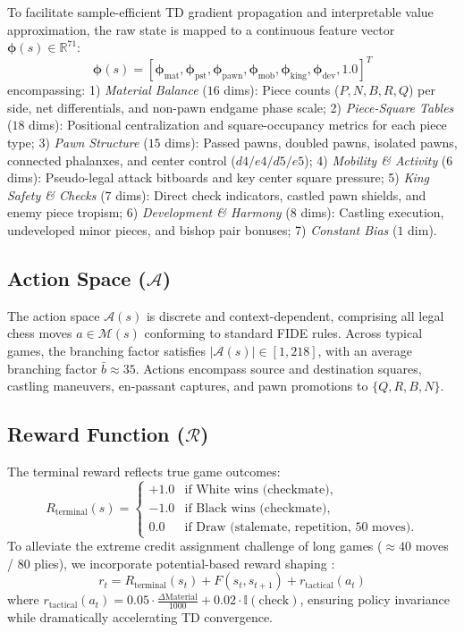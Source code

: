 \documentclass[conference,10pt,twocolumn]{IEEEtran}
\begin{document}
To facilitate sample-efficient TD gradient propagation and interpretable value approximation, the raw state is mapped to a continuous feature vector $\boldsymbol{\phi}(s) \in \mathbb{R}^{71}$:
\begin{equation}
\boldsymbol{\phi}(s) = \left[ \boldsymbol{\phi}_{\text{mat}}, \boldsymbol{\phi}_{\text{pst}}, \boldsymbol{\phi}_{\text{pawn}}, \boldsymbol{\phi}_{\text{mob}}, \boldsymbol{\phi}_{\text{king}}, \boldsymbol{\phi}_{\text{dev}}, 1.0 \right]^T
\end{equation}
encompassing:
1) \textit{Material Balance} ($16$ dims): Piece counts ($P, N, B, R, Q$) per side, net differentials, and non-pawn endgame phase scale;
2) \textit{Piece-Square Tables} ($18$ dims): Positional centralization and square-occupancy metrics for each piece type;
3) \textit{Pawn Structure} ($15$ dims): Passed pawns, doubled pawns, isolated pawns, connected phalanxes, and center control ($d4/e4/d5/e5$);
4) \textit{Mobility \& Activity} ($6$ dims): Pseudo-legal attack bitboards and key center square pressure;
5) \textit{King Safety \& Checks} ($7$ dims): Direct check indicators, castled pawn shields, and enemy piece tropism;
6) \textit{Development \& Harmony} ($8$ dims): Castling execution, undeveloped minor pieces, and bishop pair bonuses;
7) \textit{Constant Bias} ($1$ dim).

\subsection{Action Space ($\mathcal{A}$)}
The action space $\mathcal{A}(s)$ is discrete and context-dependent, comprising all legal chess moves $a \in \mathcal{M}(s)$ conforming to standard FIDE rules. Across typical games, the branching factor satisfies $|\mathcal{A}(s)| \in [1, 218]$, with an average branching factor $\bar{b} \approx 35$. Actions encompass source and destination squares, castling maneuvers, en-passant captures, and pawn promotions to $\{Q, R, B, N\}$.

\subsection{Reward Function ($\mathcal{R}$)}
The terminal reward reflects true game outcomes:
\begin{equation}
R_{\text{terminal}}(s) = \begin{cases} 
+1.0 & \text{if White wins (checkmate)}, \\
-1.0 & \text{if Black wins (checkmate)}, \\
0.0 & \text{if Draw (stalemate, repetition, 50 moves)}.
\end{cases}
\end{equation}
To alleviate the extreme credit assignment challenge of long games ($\approx 40$ moves / $80$ plies), we incorporate potential-based reward shaping \cite{ng1999}:
\begin{equation}
r_t = R_{\text{terminal}}(s_t) + F(s_t, s_{t+1}) + r_{\text{tactical}}(a_t)
\end{equation}
where $r_{\text{tactical}}(a_t) = 0.05 \cdot \frac{\Delta \text{Material}}{1000} + 0.02 \cdot \mathbb{I}(\text{check})$, ensuring policy invariance while dramatically accelerating TD convergence.
\end{document}
